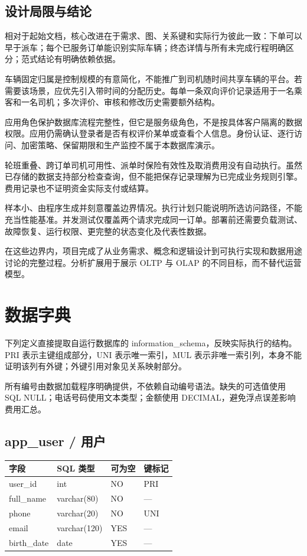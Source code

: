 \documentclass[11pt,a4paper]{article}
\renewcommand{\arraystretch}{1.3}
\begin{document}
\subsection{设计局限与结论}
相对于起始文档，核心改进在于需求、图、关系键和实际行为彼此一致：下单可以早于派车；每个已服务订单能识别实际车辆；终态详情与所有未完成行程明确区分；范式结论有明确依赖依据。

车辆固定归属是控制规模的有意简化，不能推广到司机随时间共享车辆的平台。若需要该场景，应优先引入带时间的分配历史。每单一条双向评价记录适用于一名乘客和一名司机；多次评价、审核和修改历史需要额外结构。

应用角色保护数据库流程完整性，但它是服务级角色，不是按具体客户隔离的数据权限。应用仍需确认登录者是否有权评价某单或查看个人信息。身份认证、逐行访问、加密策略、保留期限和生产监控不属于本数据库演示。

轮班重叠、跨订单司机可用性、派单时保险有效性及取消费用没有自动执行。虽然已存储的数据支持部分检查查询，但不能把保存记录理解为已完成业务规则引擎。费用记录也不证明资金实际支付或结算。

样本小、由程序生成并刻意覆盖边界情况。执行计划只能说明所选访问路径，不能充当性能基准。并发测试仅覆盖两个请求完成同一订单。部署前还需要负载测试、故障恢复、运行权限、更完整的状态变化及代表性数据。

在这些边界内，项目完成了从业务需求、概念和逻辑设计到可执行实现和数据用途讨论的完整过程。分析扩展用于展示 OLTP 与 OLAP 的不同目标，而不替代运营模型。


\appendix
\clearpage
\section{数据字典}
下列定义直接提取自运行数据库的 information\_\allowbreak{}schema，反映实际执行的结构。PRI 表示主键组成部分，UNI 表示唯一索引，MUL 表示非唯一索引列，本身不能证明该列有外键；外键引用对象见关系映射部分。

所有编号由数据加载程序明确提供，不依赖自动编号语法。缺失的可选值使用 SQL NULL；电话号码使用文本类型；金额使用 DECIMAL，避免浮点误差影响费用汇总。

\begingroup\renewcommand{\arraystretch}{1.08}\titlespacing*{\subsection}{0pt}{7pt}{3pt}\subsection*{app\_\allowbreak{}user / 用户}
\par\begingroup\small\noindent
\begin{tabularx}{\linewidth}{p{4.4cm}p{4.0cm}p{1.5cm}X}
\toprule
字段 & SQL 类型 & 可为空 & 键标记\\\midrule
user\_\allowbreak{}id & int & NO & PRI\\
full\_\allowbreak{}name & varchar(80) & NO & —\\
phone & varchar(20) & NO & UNI\\
email & varchar(120) & YES & —\\
birth\_\allowbreak{}date & date & YES & —\\
\bottomrule
\end{tabularx}
\par\endgroup
\end{document}
